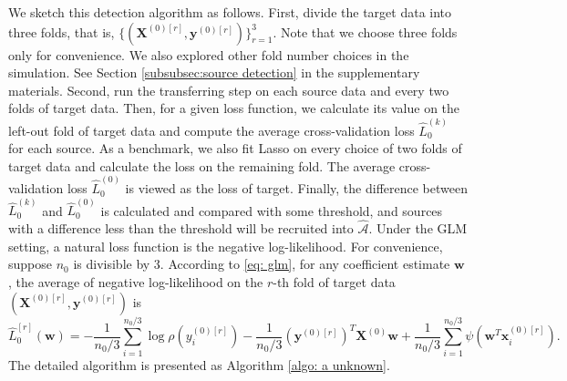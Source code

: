 \documentclass[12pt]{article}
\newcommand{\bx}{\bm{x}}
\newcommand{\bw}{\bm{w}}
\newcommand{\ma}{\mathcal{A}}
\newcommand{\by}{\bm{y}}
\newcommand{\bX}{\bm{X}}
\newcommand{\<}{\langle}
\renewcommand{\>}{\rangle}
\begin{document}
We sketch this detection algorithm as follows. First, divide the target data into three folds, that is, $\{(\bX^{(0)[r]},\by^{(0)[r]})\}_{r=1}^3$. Note that we choose three folds only for convenience. We also explored other fold number choices in the simulation. See Section \ref{subsubsec:source detection} in the supplementary materials. Second, run the transferring step on each source data and every two folds of target data. Then, for a given loss function, we calculate its value on the left-out fold of target data and compute the average cross-validation loss $\hat{L}_0^{(k)}$ for each source. As a benchmark, we also fit Lasso on every choice of two folds of target data and calculate the loss on the remaining fold. The average cross-validation loss $\hat{L}_0^{(0)}$ is viewed as the loss of target. Finally, the difference between $\hat{L}_0^{(k)}$ and $\hat{L}_0^{(0)}$ is calculated and compared with some threshold, and sources with a difference less than the threshold will be recruited into $\widehat{\ma}$. Under the GLM setting, a natural loss function is the negative log-likelihood. For convenience, suppose $n_0$ is divisible by 3. According to \eqref{eq: glm}, for any coefficient estimate $\bw$, the average of negative log-likelihood on the $r$-th fold of target data $(\bX^{(0)[r]}, \by^{(0)[r]})$ is 
\begin{equation}\label{eq: l0 hat def}
	\hat{L}_0^{[r]}(\bw) =-\frac{1}{n_0/3}\sum\limits_{i=1}^{n_0/3}\log \rho(y_i^{(0)[r]})  -\frac{1}{n_0/3}(\by^{(0)[r]})^T\bX^{(0)}\bm{w} + \frac{1}{n_0/3}\sum\limits_{i=1}^{n_0/3}\psi(\bm{w}^T\bx^{(0)[r]}_i).
\end{equation}
The detailed algorithm is presented as Algorithm \ref{algo: a unknown}. 
\end{document}
